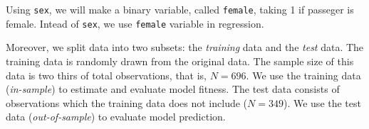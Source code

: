 \documentclass[
  12pt,
]{article}
\newenvironment{Shaded}{\begin{snugshade}}{\end{snugshade}}
\newcommand{\DataTypeTok}[1]{\textcolor[rgb]{0.13,0.29,0.53}{#1}}
\newcommand{\DecValTok}[1]{\textcolor[rgb]{0.00,0.00,0.81}{#1}}
\newcommand{\KeywordTok}[1]{\textcolor[rgb]{0.13,0.29,0.53}{\textbf{#1}}}
\newcommand{\NormalTok}[1]{#1}
\newcommand{\OperatorTok}[1]{\textcolor[rgb]{0.81,0.36,0.00}{\textbf{#1}}}
\newcommand{\OtherTok}[1]{\textcolor[rgb]{0.56,0.35,0.01}{#1}}
\newcommand{\StringTok}[1]{\textcolor[rgb]{0.31,0.60,0.02}{#1}}
\begin{document}
Using \texttt{sex}, we will make a binary variable, called \texttt{female}, taking 1 if passeger is female.
Intead of \texttt{sex}, we use \texttt{female} variable in regression.

Moreover, we split data into two subsets: the \emph{training} data and the \emph{test} data.
The training data is randomly drawn from the original data.
The sample size of this data is two thirs of total observations, that is, \(N = 696\).
We use the training data (\emph{in-sample}) to estimate and evaluate model fitness.
The test data consists of observations which the training data does not include (\(N = 349\)).
We use the test data (\emph{out-of-sample}) to evaluate model prediction.

\begin{Shaded}
\end{Shaded}
\end{document}
